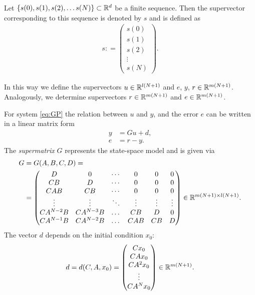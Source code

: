 \begin{defi}
	Let $\{s(0), s(1), s(2), \dots s(N)\} \subset {\mathbb{R}}^{d}$ be a finite sequence. Then the supervector corresponding to this sequence is denoted by $s$ and is defined as 
\begin{align}
s: = \begin{pmatrix}
s(0) \\ s(1) \\ s(2) \\ \vdots \\ s(N)
\end{pmatrix}.
\end{align}
\end{defi}

In this way we define the supervectors $u \in {\mathbb{R}}^{l(N+1)} $ and $e$, $y$, $r \in {\mathbb{R}}^{m(N+1)}$. 
Analogously, we determine supervectors $r\in {\mathbb{R}}^{m(N+1)}$ and $e\in {\mathbb{R}}^{m(N+1)}$. 

For system \eqref{eq:GP} the relation between $u$ and $y$, and the error $e$ can be written in a linear matrix form 
\begin{align}
\label{eq:Gu + d}
y &= Gu + d, \\
e &= r - y.
\end{align}
The \textit{supermatrix} $G$ represents the state-space model and is given via  
\begin{align}
\label{eq:Gmatrix}
\begin{split}
G &= G(A,B,C,D) = \\
&=  \begin{pmatrix}
D & 0 & \cdots & 0 & 0 & 0 \\
CB & D & \cdots & 0 & 0 & 0\\
CAB & CB & \cdots & 0 & 0 & 0\\
\vdots & \vdots & \ddots & \vdots  & \vdots & \vdots \\
CA^{N-2} B & CA^{N-3} B &\dots &CB & D& 0\\
CA^{N-1} B & CA^{N-2} B &\dots &CAB & CB& D\\
\end{pmatrix} \in {\mathbb{R}}^{m(N+1)\times l(N+1)}.
\end{split}
\end{align}
The vector $d$ depends on the initial condition $x_0$:
\begin{align}
d = d(C,A,x_0) = \begin{pmatrix}
C x_0 \\ CA x_0 \\ CA^2 x_0 \\ \vdots \\ CA^Nx_0
\end{pmatrix} \in {\mathbb{R}}^{m(N+1)}.
\end{align}

